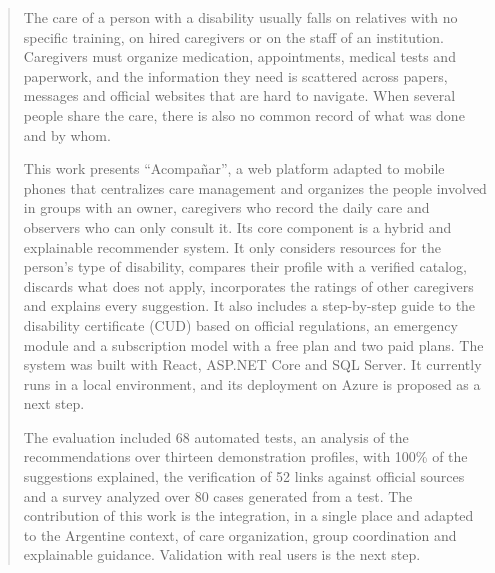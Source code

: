 
\begin{abstract}

The care of a person with a disability usually falls on relatives with no
specific training, on hired caregivers or on the staff of an institution.
Caregivers must organize medication, appointments, medical tests and
paperwork, and the information they need is scattered across papers,
messages and official websites that are hard to navigate. When several
people share the care, there is also no common record of what was done and
by whom.

This work presents ``Acompañar'', a web platform adapted to mobile phones that
centralizes care management and organizes the people involved in groups
with an owner, caregivers who record the daily care and observers who can
only consult it. Its core component is a hybrid and explainable recommender
system. It only considers resources for the person's type of disability,
compares their profile with a verified catalog, discards what does not
apply, incorporates the ratings of other caregivers and explains every
suggestion. It also includes a step-by-step guide to the disability
certificate (CUD) based on official regulations, an emergency module and a
subscription model with a free plan and two paid plans. The system was built
with React, ASP.NET Core and SQL Server. It currently runs in a local
environment, and its deployment on Azure is proposed as a next step.

The evaluation included 68 automated tests, an analysis of the
recommendations over thirteen demonstration profiles, with 100\% of the
suggestions explained, the verification of 52 links against official
sources and a survey analyzed over 80 cases generated from a test. The
contribution of this work is the integration, in a single place and adapted
to the Argentine context, of care organization, group coordination and
explainable guidance. Validation with real users is the next step.

\end{abstract}
